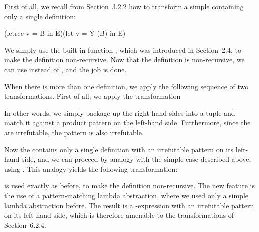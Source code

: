{First of all, we recall from Section~3.2.2 how to transform a simple 
containing only a single definition:
\begin{mlcoded}
(letrec v = B in E)\equivalent (let v = Y (B) in E)
\end{mlcoded}
We simply use the built-in function , which was introduced in Section~2.4, to
make the definition non-recursive. Now that the definition is non-recursive,
we can use  instead of , and the job is done.

When there is more than one definition, we apply the following sequence of
two transformations. First of all, we apply the transformation

\noindent In other words, we simply package up the right-hand sides into a tuple and
match it against a product pattern on the left-hand side. Furthermore, since
the  are irrefutable, the pattern  is also irrefutable.

Now the  contains only a single definition with an irrefutable pattern
on its left-hand side, and we can proceed by analogy with the simple case
described above, using . This analogy yields the following transformation:

 is used exactly as before, to make the definition non-recursive. The new
feature is the use of a pattern-matching lambda abstraction, where we used
only a simple lambda abstraction before. The result is a -expression with an
irrefutable pattern on its left-hand side, which is therefore amenable to the
transformations of Section~6.2.4.

}
